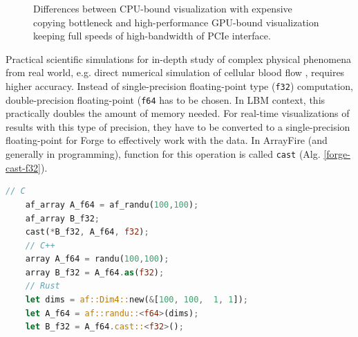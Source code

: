 \begin{figure}[!ht]
	\centering
	 \qquad
	\caption{Differences between CPU-bound visualization with expensive copying bottleneck and high-performance GPU-bound visualization keeping full speeds of high-bandwidth of PCIe interface.}
	\label{fig:viz-forge-main}
\end{figure}

Practical scientific simulations for in-depth study of complex physical phenomena from real world, e.g. direct numerical simulation of cellular blood flow \citep{kotsalosDigitalBloodMassively2019}, requires higher accuracy. Instead of single-precision floating-point type (\texttt{f32}) computation, double-precision floating-point (\texttt{f64} has to be chosen. In LBM context, this practically doubles the amount of memory needed. For real-time visualizations of results with this type of precision, they have to be converted to a single-precision floating-point for Forge to effectively work with the data. In ArrayFire (and generally in programming), function for this operation is called \texttt{cast} (Alg. \ref{forge-cast-f32}).

\begin{lstlisting}[language=Rust, caption={Converting to single precision floating point for Forge visualization in C, C++ and Rust}, label=forge-cast-f32]
	// C
	af_array A_f64 = af_randu(100,100);
	af_array B_f32;
	cast(*B_f32, A_f64, f32);
	// C++
	array A_f64 = randu(100,100);
	array B_f32 = A_f64.as(f32);
	// Rust
	let dims = af::Dim4::new(&[100, 100,  1, 1]);
	let A_f64 = af::randu::<f64>(dims);
	let B_f32 = A_f64.cast::<f32>();
\end{lstlisting}


